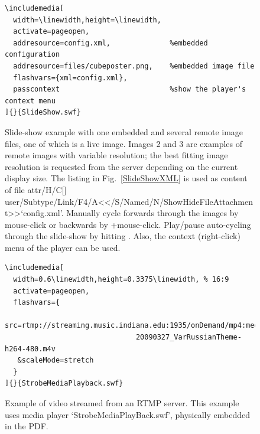 \documentclass[a4paper]{article}
\begin{document}
\makeatletter%
\def\myAcrobatmenu#1#2{\leavevmode\pdfstartlink attr{\Hy@setpdfborder\ifx\@pdfhighlight\@empty\else/H\@pdfhighlight\fi\ifx\@menubordercolor\relax\else/C[\@menubordercolor]\fi} user{/Subtype/Link\ifHy@pdfa/F4\fi/A<</S/Named/N/#1>>}\relax\Hy@colorlink\@menucolor#2\close@pdflink}\makeatother
\savebox{\COO}{\keys{\shift+}}
\begin{figure}[bp]
\centering
\begin{Verbatim}
\includemedia[
  width=\linewidth,height=\linewidth,
  activate=pageopen,
  addresource=config.xml,              %embedded configuration
  addresource=files/cubeposter.png,    %embedded image file
  flashvars={xml=config.xml},
  passcontext                          %show the player's context menu
]{}{SlideShow.swf}
\end{Verbatim}
\vspace{1ex}
\caption{Slide-show example with one embedded and several remote image files, one of which is a live image. Images 2 and 3 are examples of remote images with variable resolution; the best fitting image resolution is requested from the server depending on the current display size. The listing in Fig.~\ref{SlideShowXML} is used as content of file \myAcrobatmenu{ShowHideFileAttachment}{`config.xml'}. Manually cycle forwards through the images by mouse-click or backwards by \usebox{\COO}+mouse-click. Play/pause auto-cycling through the slide-show by hitting \usebox{\CtoC}. Also, the context (right-click) menu of the player can be used.}\label{slideshowex}
\end{figure}

\begin{figure}[bp]
\centering
\begin{Verbatim}
\includemedia[
  width=0.6\linewidth,height=0.3375\linewidth, % 16:9
  activate=pageopen,
  flashvars={
    src=rtmp://streaming.music.indiana.edu:1935/onDemand/mp4:media/%
                               20090327_VarRussianTheme-h264-480.m4v
   &scaleMode=stretch
  }
]{}{StrobeMediaPlayback.swf}
\end{Verbatim}
\vspace{1ex}
\caption{Example of video streamed from an RTMP server. This example uses media player `StrobeMediaPlayBack.swf', physically embedded in the PDF.}\label{videob}
\end{figure}
\end{document}
